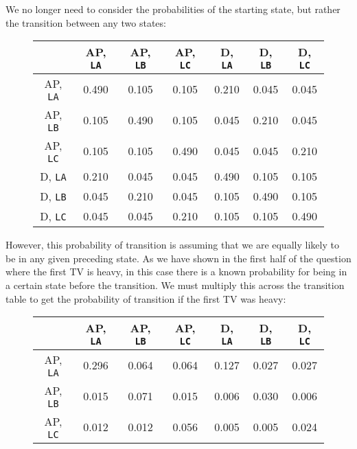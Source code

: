 \documentclass{article}
\begin{document}
\begin{enumerate}[start=0]
\begin{enumerate}
    We no longer need to consider the probabilities of the starting state, but
    rather the transition between any two states:
    \begin{figure}[H]
    \centering
    \begin{tabular}{|c||c|c|c|c|c|c|}
        \hline
            & AP, \texttt{LA} &
            AP, \texttt{LB}&
            AP, \texttt{LC}&
            D, \texttt{LA}&
            D, \texttt{LB}&
            D, \texttt{LC}\\\hline
            AP, \texttt{LA}&
            0.490 & 0.105 & 0.105 & 0.210 & 0.045 & 0.045\\\hline
            AP, \texttt{LB}&
            0.105 & 0.490 & 0.105 & 0.045 & 0.210 & 0.045\\\hline
            AP, \texttt{LC}&
            0.105 & 0.105 & 0.490 & 0.045 & 0.045 & 0.210\\\hline
            D, \texttt{LA}&
            0.210 & 0.045 & 0.045 & 0.490 & 0.105 & 0.105\\\hline
            D, \texttt{LB}&
            0.045 & 0.210 & 0.045 & 0.105 & 0.490 & 0.105\\\hline
            D, \texttt{LC}&
            0.045 & 0.045 & 0.210 & 0.105 & 0.105 & 0.490\\\hline
    \end{tabular}
    \end{figure}
    However, this probability of transition is assuming that we are equally
    likely to be in any given preceding state. As we have shown in the first
    half of the question where the first TV is heavy, in this case there is a
    known probability for being in a certain state before the transition. We
    must multiply this across the transition table to get the probability of
    transition if the first TV was heavy:
    \begin{figure}[H]
    \centering
    \begin{tabular}{|c||c|c|c|c|c|c|}
        \hline
            & AP, \texttt{LA} &
            AP, \texttt{LB}&
            AP, \texttt{LC}&
            D, \texttt{LA}&
            D, \texttt{LB}&
            D, \texttt{LC}\\\hline
            AP, \texttt{LA}&
            0.296 & 0.064 & 0.064 & 0.127 & 0.027 & 0.027 \\\hline
            AP, \texttt{LB}&
            0.015 & 0.071 & 0.015 & 0.006 & 0.030 & 0.006 \\\hline
            AP, \texttt{LC}&
            0.012 & 0.012 & 0.056 & 0.005 & 0.005 & 0.024 \\\hline

\end{tabular}
\end{figure}
\end{enumerate}
\end{enumerate}
\end{document}
